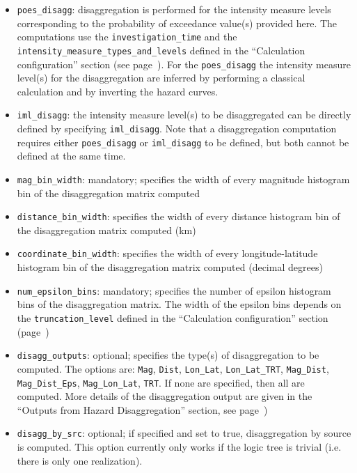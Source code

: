 \begin{itemize}

    \item \Verb+poes_disagg+: disaggregation is performed for the intensity
    measure levels corresponding to the probability of exceedance value(s) provided
    here. The computations use the \texttt{investigation\_time} and the
    \texttt{intensity\_measure\_types\_and\_levels} defined in the
    ``Calculation configuration'' section   (see page~\pageref{sec:calculation_configuration}).
    For the \texttt{poes\_disagg} the intensity measure level(s) for the disaggregation are
    inferred by performing a classical calculation and by inverting the hazard curves.

    \item \Verb+iml_disagg+: the intensity measure level(s) to be disaggregated can be directly defined
    by specifying \texttt{iml\_disagg}. Note that a
    disaggregation computation requires either \texttt{poes\_disagg} or
    \texttt{iml\_disagg} to be defined, but both cannot be defined at the same time.

    \item \Verb+mag_bin_width+: mandatory; specifies the width of every magnitude
     histogram bin of the disaggregation matrix computed

    \item \Verb+distance_bin_width+: specifies the width of every distance
    histogram bin of the disaggregation matrix computed (km)

    \item \Verb+coordinate_bin_width+: specifies the width of every longitude-latitude
    histogram bin of the disaggregation matrix computed (decimal degrees)

    \item \Verb+num_epsilon_bins+: mandatory; specifies the number of epsilon
    histogram bins of the disaggregation matrix. The width of the epsilon bins
    depends on the \texttt{truncation\_level} defined in the
    ``Calculation configuration'' section (page~\pageref{sec:calculation_configuration})

    \item \Verb+disagg_outputs+: optional; specifies the type(s) of disaggregation
    to be computed. The options are: \texttt{Mag}, \texttt{Dist}, \texttt{Lon\_Lat},
    \texttt{Lon\_Lat\_TRT}, \texttt{Mag\_Dist}, \texttt{Mag\_Dist\_Eps},
    \texttt{Mag\_Lon\_Lat}, \texttt{TRT}. If none are specified, then all are
    computed. More details of the disaggregation output are given in the
    ``Outputs from Hazard Disaggregation'' section,
    see page~\pageref{subsec:output_hazard_disaggregation})

    \item \Verb+disagg_by_src+: optional; if specified and set to true, disaggregation
    by source is computed. This option currently only works if the logic tree is trivial
    (i.e. there is only one realization).

\end{itemize}


